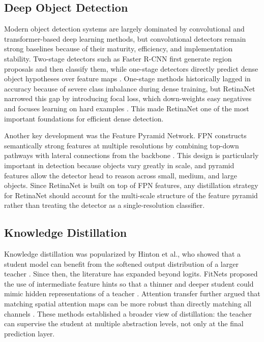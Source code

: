 \documentclass[12pt]{article}
\begin{document}
\subsection{Deep Object Detection}
Modern object detection systems are largely dominated by convolutional and transformer-based deep learning methods, but convolutional detectors remain strong baselines because of their maturity, efficiency, and implementation stability. Two-stage detectors such as Faster R-CNN first generate region proposals and then classify them, while one-stage detectors directly predict dense object hypotheses over feature maps \cite{ren2015faster}. One-stage methods historically lagged in accuracy because of severe class imbalance during dense training, but RetinaNet narrowed this gap by introducing focal loss, which down-weights easy negatives and focuses learning on hard examples \cite{lin2017focal}. This made RetinaNet one of the most important foundations for efficient dense detection.

Another key development was the Feature Pyramid Network. FPN constructs semantically strong features at multiple resolutions by combining top-down pathways with lateral connections from the backbone \cite{lin2017fpn}. This design is particularly important in detection because objects vary greatly in scale, and pyramid features allow the detector head to reason across small, medium, and large objects. Since RetinaNet is built on top of FPN features, any distillation strategy for RetinaNet should account for the multi-scale structure of the feature pyramid rather than treating the detector as a single-resolution classifier.

\subsection{Knowledge Distillation}
Knowledge distillation was popularized by Hinton et al., who showed that a student model can benefit from the softened output distribution of a larger teacher \cite{hinton2015distilling}. Since then, the literature has expanded beyond logits. FitNets proposed the use of intermediate feature hints so that a thinner and deeper student could mimic hidden representations of a teacher \cite{romero2015fitnets}. Attention transfer further argued that matching spatial attention maps can be more robust than directly matching all channels \cite{zagoruyko2017paying}. These methods established a broader view of distillation: the teacher can supervise the student at multiple abstraction levels, not only at the final prediction layer.
\end{document}
